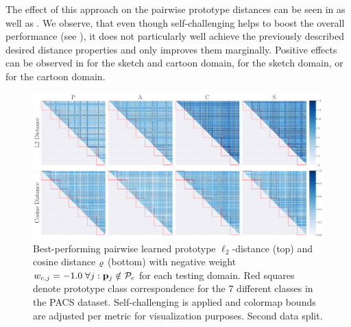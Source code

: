 The effect of this approach on the pairwise prototype distances can be seen in  as well as . We observe, that even though self-challenging helps to boost the overall performance (see ), it does not particularly well achieve the previously described desired distance properties and only improves them marginally. Positive effects can be observed in  for the sketch and cartoon domain,  for the sketch domain, or  for the cartoon domain.


\begin{figure}[t]
    \centering
    \includegraphics[width=\textwidth]{Figures/Chapter4/2021-01-21-ProDropIncorrectWeight-1.0WithSCdrop_f0.5SAVEResNet18oracle_validation_trial1.pdf}
    \caption[Second data split pairwise self-challenging prototype distances with $w_{c,j} = -1.0$] {Best-performing pairwise learned prototype $\ell_2$-distance (top) and cosine distance $\varrho$ (bottom) with negative weight $w_{c,j} = -1.0\; \forall j: \mathbf{p}_{j} \notin \mathcal{P}_c$ for each testing domain. Red squares denote prototype class correspondence for the $7$ different classes in the PACS dataset. Self-challenging is applied and colormap bounds are adjusted per metric for visualization purposes. Second data split.}
    \label{fig:pw_distance_trial1-sc}
\end{figure}

